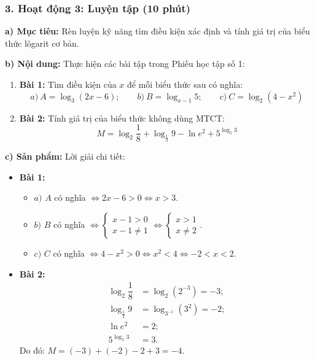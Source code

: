 \documentclass[12pt, a4paper]{article}
\begin{document}
\subsubsection*{3. Hoạt động 3: Luyện tập (10 phút)}

\noindent \textbf{a) Mục tiêu:}
Rèn luyện kỹ năng tìm điều kiện xác định và tính giá trị của biểu thức lôgarit cơ bản.

\noindent \textbf{b) Nội dung:}
Thực hiện các bài tập trong Phiếu học tập số 1:
\begin{enumerate}[leftmargin=0.6cm]
    \item \textbf{Bài 1:} Tìm điều kiện của $x$ để mỗi biểu thức sau có nghĩa:
    $$a) \ A = \log_3 (2x - 6); \qquad b) \ B = \log_{x - 1} 5; \qquad c) \ C = \log_2 (4 - x^2)$$
    \item \textbf{Bài 2:} Tính giá trị của biểu thức không dùng MTCT:
    $$M = \log_2 \dfrac{1}{8} + \log_{\frac{1}{3}} 9 - \ln e^2 + 5^{\log_5 3}$$
\end{enumerate}

\noindent \textbf{c) Sản phẩm:}
Lời giải chi tiết:
\begin{itemize}
    \item \textbf{Bài 1:}
    \begin{itemize}
        \item $a)$ $A$ có nghĩa $\iff 2x - 6 > 0 \iff x > 3$.
        \item $b)$ $B$ có nghĩa $\iff \begin{cases} x - 1 > 0 \\ x - 1 \neq 1 \end{cases} \iff \begin{cases} x > 1 \\ x \neq 2 \end{cases}$.
        \item $c)$ $C$ có nghĩa $\iff 4 - x^2 > 0 \iff x^2 < 4 \iff -2 < x < 2$.
    \end{itemize}
    \item \textbf{Bài 2:}
    \begin{align*}
        \log_2 \dfrac{1}{8} &= \log_2 (2^{-3}) = -3; \\
        \log_{\frac{1}{3}} 9 &= \log_{3^{-1}} (3^2) = -2; \\
        \ln e^2 &= 2; \\
        5^{\log_5 3} &= 3.
    \end{align*}
    Do đó: $M = (-3) + (-2) - 2 + 3 = -4$.
\end{itemize}
\end{document}
